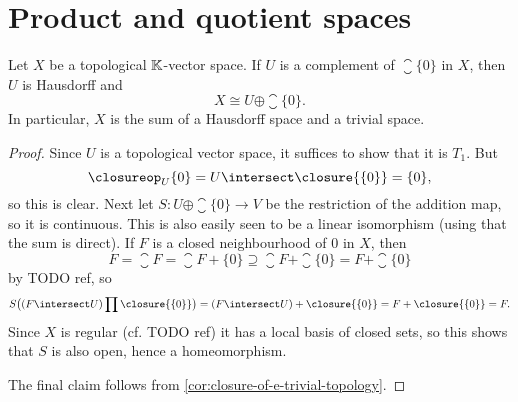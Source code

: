\documentclass[article, a4paper, 11pt, oneside]{memoir}
\numberwithin{equation}{chapter}
\begin{document}
\section{Product and quotient spaces}

\begin{theorem}[Products]
    
\end{theorem}


\begin{proposition}
    \label{prop:vector-space-sum-of-Hausdorff-and-trivial}
    Let $X$ be a topological $\mathbb{K}$-vector space. If $U$ is a complement of $\closure{\{0\}}$ in $X$, then $U$ is Hausdorff and
    \begin{equation*}
        X
            \cong U \oplus \closure{\{0\}}.
    \end{equation*}
    In particular, $X$ is the sum of a Hausdorff space and a trivial space.
\end{proposition}

\begin{proof}
    Since $U$ is a topological vector space, it suffices to show that it is $T_1$. But
    \begin{equation*}
        \closureop_U \{0\}
            = U \intersect \closure{\{0\}}
            = \{0\},
    \end{equation*}
    so this is clear. Next let $S \colon U \oplus \closure{\{0\}} \to V$ be the restriction of the addition map, so it is continuous. This is also easily seen to be a linear isomorphism (using that the sum is direct). If $F$ is a closed neighbourhood of $0$ in $X$, then
    \begin{equation*}
        F
            = \closure{F}
            = \closure{F + \{0\}}
            \supseteq \closure{F} + \closure{\{0\}}
            = F + \closure{\{0\}}
    \end{equation*}
    by TODO ref, so
    \begin{equation*}
        S \bigl( (F \intersect U) \prod \closure{\{0\}} \bigr)
            = (F \intersect U) + \closure{\{0\}}
            = F + \closure{\{0\}}
            = F.
    \end{equation*}
    Since $X$ is regular (cf. TODO ref) it has a local basis of closed sets, so this shows that $S$ is also open, hence a homeomorphism.

    The final claim follows from \cref{cor:closure-of-e-trivial-topology}.
\end{proof}
\end{document}
